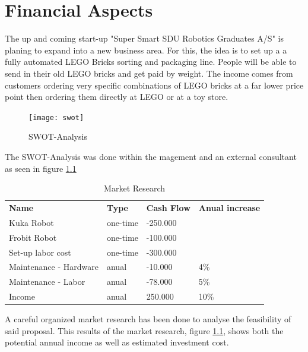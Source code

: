 \chapter{Financial Aspects}\label{chap:financial_aspects_chapter}
The up and coming start-up "Super Smart SDU Robotics Graduates A/S" is planing to expand into a new business area. For this, the idea is to set up a a fully automated LEGO Bricks sorting and packaging line. People will be able to send in their old LEGO bricks and get paid by weight. The income comes from customers ordering very specific combinations of LEGO bricks at a far lower price point then ordering them directly at LEGO or at a toy store. \\
	\begin{figure}[H]
        \centering
        \texttt{[image: swot]}
        \caption{SWOT-Analysis}
        \label{fig:swot}
    \end{figure}
The SWOT-Analysis was done within the magement and an external consultant as seen in figure \ref{fig:swot}
\begin{table}[]
\centering
\begin{tabular}{llll}
\textbf{Name}          & \textbf{Type} & \textbf{Cash Flow} & \textbf{Anual increase} \\
Kuka Robot             & one-time      & -250.000           &                         \\
Frobit Robot           & one-time      & -100.000           &                         \\
Set-up labor cost      & one-time      & -300.000           &                         \\
Maintenance - Hardware & anual         & -10.000            & 4\%                     \\
Maintenance - Labor    & anual         & -78.000            & 5\%                     \\
Income                 & anual         & 250.000            & 10\%                   
\end{tabular}
\caption{Market Research}
\label{tab:market_research}
\end{table}
A careful organized market research has been done to analyse the feasibility of said proposal. This results of the market research, figure \ref{tab:market_research}, shows both the potential annual income as well as estimated investment cost.
